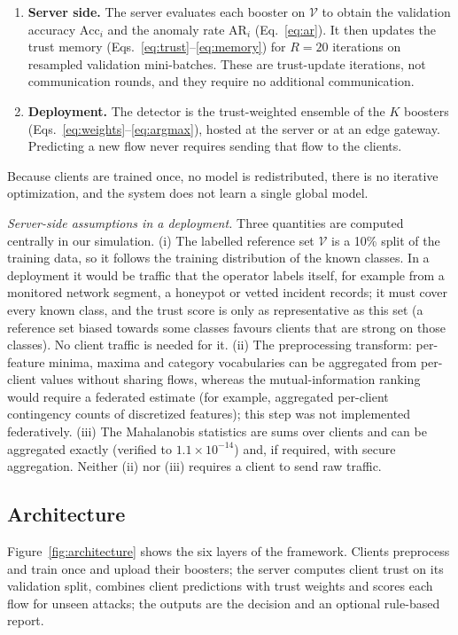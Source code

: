 \documentclass[pdflatex,sn-mathphys-num]{sn-jnl}
\newcommand{\Rtwo}{\color{blue}}
\begin{document}
{{\begin{enumerate}
\item \textbf{Server side.} The server evaluates each booster on $\mathcal{V}$ to obtain the validation accuracy $\mathrm{Acc}_i$ and the anomaly rate $\mathrm{AR}_i$ (Eq.~\ref{eq:ar}). It then updates the trust memory (Eqs.~\ref{eq:trust}--\ref{eq:memory}) for $R=20$ iterations on resampled validation mini-batches. These are trust-update iterations, not communication rounds, and they require no additional communication.
\item \textbf{Deployment.} The detector is the trust-weighted ensemble of the $K$ boosters (Eqs.~\ref{eq:weights}--\ref{eq:argmax}), hosted at the server or at an edge gateway. Predicting a new flow never requires sending that flow to the clients.
\end{enumerate}
Because clients are trained once, no model is redistributed, there is no iterative optimization, and the system does not learn a single global model.

{\Rtwo \emph{Server-side assumptions in a deployment.} Three quantities are computed centrally in our simulation. (i) The labelled reference set $\mathcal{V}$ is a 10\% split of the training data, so it follows the training distribution of the known classes. In a deployment it would be traffic that the operator labels itself, for example from a monitored network segment, a honeypot or vetted incident records; it must cover every known class, and the trust score is only as representative as this set (a reference set biased towards some classes favours clients that are strong on those classes). No client traffic is needed for it. (ii) The preprocessing transform: per-feature minima, maxima and category vocabularies can be aggregated from per-client values without sharing flows, whereas the mutual-information ranking would require a federated estimate (for example, aggregated per-client contingency counts of discretized features); this step was not implemented federatively. (iii) The Mahalanobis statistics are sums over clients and can be aggregated exactly (verified to $1.1\times10^{-14}$) and, if required, with secure aggregation. Neither (ii) nor (iii) requires a client to send raw traffic.}

\subsection{Architecture}\label{sec:architecture}
Figure~\ref{fig:architecture} shows the six layers of the framework. Clients preprocess and train once and upload their boosters; the server computes client trust on its validation split, combines client predictions with trust weights and scores each flow for unseen attacks; the outputs are the decision and an optional rule-based report.}


}
\end{document}
